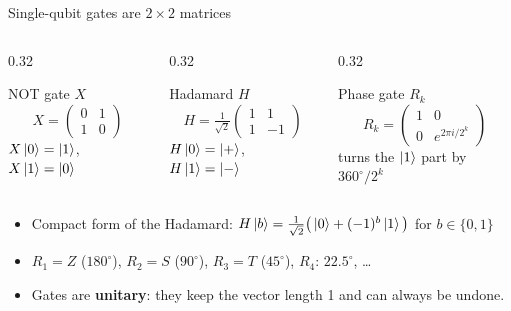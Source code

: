 \documentclass[aspectratio=169,11pt]{beamer}
\newcommand{\key}[1]{{\color{qdark}\textbf{#1}}}
\begin{document}
\begin{frame}{Single-qubit gates are $2\times 2$ matrices}
  \begin{columns}[T]
    \begin{column}{0.32\textwidth}
      \begin{block}{NOT gate $X$}
        \[ X = \begin{pmatrix}0&1\\1&0\end{pmatrix} \]
        $X\ket0 = \ket1$, $X\ket1 = \ket0$
      \end{block}
    \end{column}
    \begin{column}{0.32\textwidth}
      \begin{block}{Hadamard $H$}
        \[ H = \tfrac{1}{\sqrt2}\begin{pmatrix}1&1\\1&-1\end{pmatrix} \]
        $H\ket0 = \ket+$, $H\ket1 = \ket-$
      \end{block}
    \end{column}
    \begin{column}{0.32\textwidth}
      \begin{block}{Phase gate $R_k$}
        \[ R_k = \begin{pmatrix}1&0\\0&e^{2\pi i/2^k}\end{pmatrix} \]
        turns the $\ket1$ part by $360^\circ/2^k$
      \end{block}
    \end{column}
  \end{columns}
  \vspace{3mm}
  \begin{itemize}
    \item Compact form of the Hadamard: $H\ket{b} = \tfrac{1}{\sqrt2}\big(\ket0 + (-1)^b\ket1\big)$ for $b \in \{0,1\}$
    \item $R_1 = Z$ ($180^\circ$), $R_2 = S$ ($90^\circ$), $R_3 = T$ ($45^\circ$), $R_4$: $22.5^\circ$, \dots
    \item Gates are \key{unitary}: they keep the vector length 1 and can always be undone.
  \end{itemize}
\end{frame}
\end{document}
